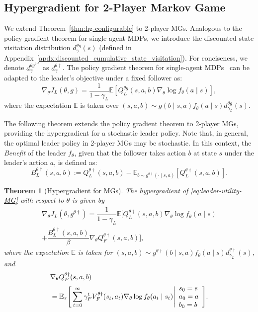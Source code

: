 \documentclass[letterpaper]{article} %
\providecommand{\E}{\mathbb{E}} %
\newtheorem{theorem}{Theorem}
\begin{document}
\subsection{Hypergradient for 2-Player Markov Game}

We extend Theorem~\ref{thm:hg-configurable} to 2-player MGs. 
Analogous to the policy gradient theorem for single-agent MDPs, we introduce the discounted state visitation distribution $d_{\gamma}^{\theta g}(s)$ (defined in Appendix~\ref{apdx:discounted_cumulative_state_visitation}).
For conciseness, we denote $d_\gamma^{\theta g^{\theta\dagger}}$ as $d_\gamma^{\theta \dag}$. 
The policy gradient theorem for single-agent MDPs~\citep{Sutton1999-su,Sutton2018-jf} can be adapted to the leader's objective under a fixed follower as:
\begin{equation*}
    \nabla_{\theta} J_L({\theta}, g) = \frac{1}{1 - \gamma_L} \E\left[ Q_L^{\theta g}(s, a, b) \nabla_{\theta} \log f_{\theta}(a\mid s)\right],
\end{equation*}
where the expectation $\E$ is taken over $(s,a,b) \sim g(b\mid s,a)f_{{\theta}}(a\mid s) d_{\gamma_L}^{\theta g}(s)$.

The following theorem extends the policy gradient theorem to 2-player MGs, providing the hypergradient for a stochastic leader policy. Note that, in general, the optimal leader policy in 2-player MGs may be stochastic.
In this context, the \emph{Benefit} of the leader $f_{{\theta}}$, given that the follower takes action $b$ at state $s$ under the leader's action $a$, is defined as:
\begin{equation*}
    B_L^{{\theta}\dagger}(s, a, b) := Q_L^{{\theta}\dagger}(s,a,b)-\E_{b\sim g^{{\theta}\dagger}(\cdot\mid s,a)}\left[Q_L^{{\theta}\dagger}(s,a,b)\right].
\end{equation*}

\begin{theorem}[Hypergradient for MGs]\label{thm:hg-mg-stochastic}
The hypergradient of \eqref{eq:leader-utility-MG} with respect to ${\theta}$ is given by
\begin{multline}
    \nabla_{{\theta}}J_L({\theta}, g^{\theta\dagger})
    =\dfrac{1}{1-\gamma_L}\E\bigg[Q_L^{{\theta}\dagger}(s,a,b)\nabla_{{\theta}}\log f_{{\theta}}(a\mid s)
   \\+\dfrac{B_L^{{\theta}\dagger}(s,a,b)}{\beta}\nabla_{\theta}Q_F^{\theta\dagger}(s,a,b)\bigg],\label{eq:hg_MG}
\end{multline}
where the expectation $\E$ is taken for $(s,a,b) \sim g^{{\theta}\dagger}(b\mid s,a)f_{{\theta}}(a\mid s) d_{\gamma_L}^{\theta\dagger}(s)$, and
\begin{align}
    &\nabla_{\theta}Q_F^{\theta\dagger}(s,a,b) \label{eq:nablaQF_MG}\\ &=\E_{\tau}\Bigg[\sum_{t=0}^\infty \gamma_F^t V_F^{{\theta}\dag}(s_t,a_t)\nabla_{{\theta}}\log f_{{\theta}}(a_t\mid s_t)\Bigg|\begin{array}{l}s_0=s\\a_0=a\\b_0=b\end{array}\Bigg].\notag
\end{align}
\end{theorem}
\end{document}
